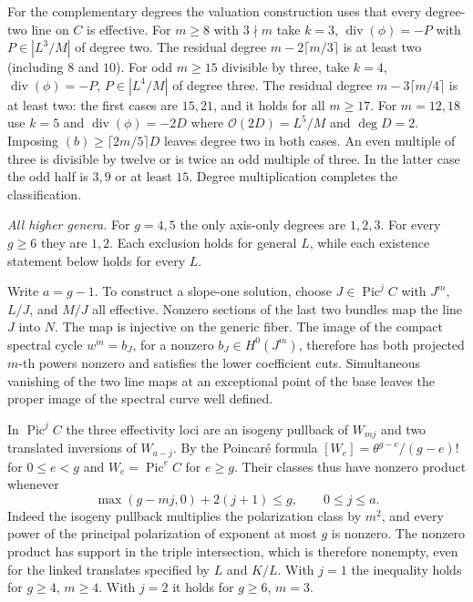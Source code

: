 For the complementary degrees the valuation construction uses that every degree-two line on $C$ is effective. For $m\ge8$ with $3\nmid m$ take $k=3$, $\operatorname{div}(\phi)=-P$ with $P\in|L^3/M|$ of degree two. The residual degree $m-2\lceil m/3\rceil$ is at least two (including $8$ and $10$). For odd $m\ge15$ divisible by three, take $k=4$, $\operatorname{div}(\phi)=-P$, $P\in|L^4/M|$ of degree three. The residual degree $m-3\lceil m/4\rceil$ is at least two: the first cases are $15,21$, and it holds for all $m\ge17$. For $m=12,18$ use $k=5$ and $\operatorname{div}(\phi)=-2D$ where $\mathcal O(2D)=L^5/M$ and $\deg D=2$. Imposing $(b)\ge\lceil2m/5\rceil D$ leaves degree two in both cases. An even multiple of three is divisible by twelve or is twice an odd multiple of three. In the latter case the odd half is $3,9$ or at least $15$. Degree multiplication completes the classification.

\emph{All higher genera.} For $g=4,5$ the only axis-only degrees are $1,2,3$. For every $g\ge6$ they are $1,2$. Each exclusion holds for general $L$, while each existence statement below holds for every $L$.

Write $a=g-1$. To construct a slope-one solution, choose $J\in\operatorname{Pic}^j C$ with $J^m$, $L/J$, and $M/J$ all effective. Nonzero sections of the last two bundles map the line $J$ into $N$. The map is injective on the generic fiber. The image of the compact spectral cycle $w^m=b_J$, for a nonzero $b_J\in H^0(J^m)$, therefore has both projected $m$-th powers nonzero and satisfies the lower coefficient cuts. Simultaneous vanishing of the two line maps at an exceptional point of the base leaves the proper image of the spectral curve well defined.

In $\operatorname{Pic}^j C$ the three effectivity loci are an isogeny pullback of $W_{mj}$ and two translated inversions of $W_{a-j}$. By the Poincaré formula $[W_e]=\theta^{g-e}/(g-e)!$ for $0\le e<g$ and $W_e=\operatorname{Pic}^e C$ for $e\ge g$. Their classes thus have nonzero product whenever
\[
 \max(g-mj,0)+2(j+1)\le g,\qquad 0\le j\le a .
\]
Indeed the isogeny pullback multiplies the polarization class by $m^2$, and every power of the principal polarization of exponent at most $g$ is nonzero. The nonzero product has support in the triple intersection, which is therefore nonempty, even for the linked translates specified by $L$ and $K/L$. With $j=1$ the inequality holds for $g\ge4$, $m\ge4$. With $j=2$ it holds for $g\ge6$, $m=3$. \cite[Introduction]{Debarre}

